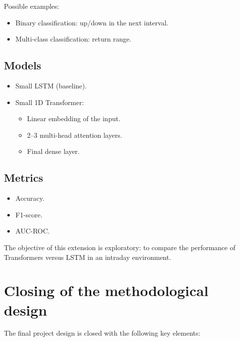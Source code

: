 \documentclass[12pt]{article}
\begin{document}
Possible examples:

\begin{itemize}
    \item Binary classification: up/down in the next interval.
    \item Multi-class classification: return range.
\end{itemize}

\subsection{Models}

\begin{itemize}
    \item Small LSTM (baseline).
    \item Small 1D Transformer:
    \begin{itemize}
        \item Linear embedding of the input.
        \item 2--3 multi-head attention layers.
        \item Final dense layer.
    \end{itemize}
\end{itemize}

\subsection{Metrics}

\begin{itemize}
    \item Accuracy.
    \item F1-score.
    \item AUC-ROC.
\end{itemize}

The objective of this extension is exploratory: to compare the performance of Transformers versus LSTM in an intraday environment.

\section{Closing of the methodological design}

The final project design is closed with the following key elements:
\end{document}
